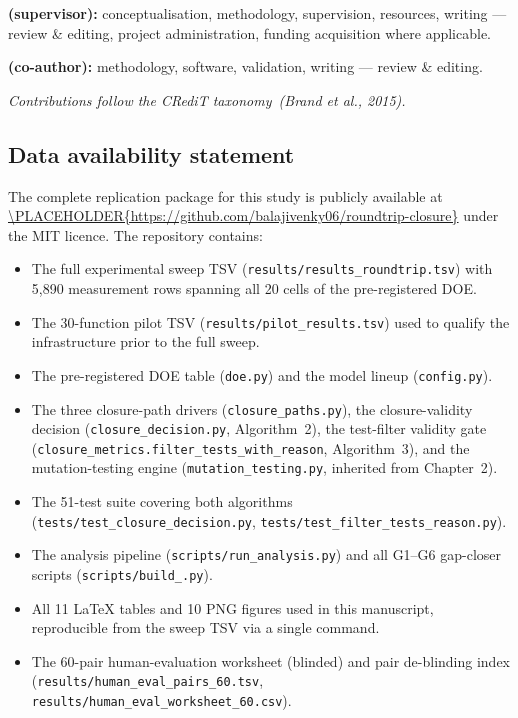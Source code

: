 \textbf{ (supervisor):} conceptualisation, methodology, supervision, resources, writing --- review \& editing, project administration, funding acquisition where applicable.

\textbf{ (co-author):} methodology, software, validation, writing --- review \& editing.

\emph{Contributions follow the CRediT taxonomy~(Brand et al., 2015).}

\subsection{Data availability statement}

The complete replication package for this study is publicly available at \url{\PLACEHOLDER{https://github.com/balajivenky06/roundtrip-closure}} under the MIT licence. The repository contains:

\begin{itemize}
  \item The full experimental sweep TSV (\texttt{results/results\_roundtrip.tsv}) with 5{,}890 measurement rows spanning all 20 cells of the pre-registered DOE.
  \item The 30-function pilot TSV (\texttt{results/pilot\_results.tsv}) used to qualify the infrastructure prior to the full sweep.
  \item The pre-registered DOE table (\texttt{doe.py}) and the model lineup (\texttt{config.py}).
  \item The three closure-path drivers (\texttt{closure\_paths.py}), the closure-validity decision (\texttt{closure\_decision.py}, Algorithm~2), the test-filter validity gate (\texttt{closure\_metrics.filter\_tests\_with\_reason}, Algorithm~3), and the mutation-testing engine (\texttt{mutation\_testing.py}, inherited from Chapter~2).
  \item The 51-test suite covering both algorithms (\texttt{tests/test\_closure\_decision.py}, \texttt{tests/test\_filter\_tests\_reason.py}).
  \item The analysis pipeline (\texttt{scripts/run\_analysis.py}) and all G1--G6 gap-closer scripts (\texttt{scripts/build\_\*.py}).
  \item All 11 LaTeX tables and 10 PNG figures used in this manuscript, reproducible from the sweep TSV via a single command.
  \item The 60-pair human-evaluation worksheet (blinded) and pair de-blinding index (\texttt{results/human\_eval\_pairs\_60.tsv}, \texttt{results/human\_eval\_worksheet\_60.csv}).
\end{itemize}

